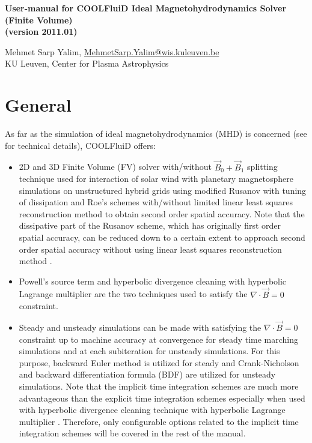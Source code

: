 \documentclass[11pt]{article}
\begin{document}
\pagestyle{empty}

\begin{center}
  {\fontsize{14}{20}\bf 
    User-manual for COOLFluiD Ideal Magnetohydrodynamics Solver (Finite Volume) \\
    (version 2011.01) \\[10pt]}
\end{center}

\begin{center}
  {Mehmet Sarp Yalim, \underline{MehmetSarp.Yalim@wis.kuleuven.be} \\
    KU Leuven, Center for Plasma Astrophysics}
\end{center}

\section{General}

As far as the simulation of ideal magnetohydrodynamics (MHD) is concerned (see \cite{yalim08, phd:yalim, yalim11jcp, yalim11jgr} for technical details), COOLFluiD \cite{lani05, lani06, phd:lani, phd:quintino, phd:wuilbaut} offers: 
\begin{itemize}
\item 
  2D and 3D Finite Volume (FV) solver with/without $\vec{B}_{0}+\vec{B}_{1}$ splitting technique \cite{tanaka94} used for interaction of solar wind with planetary magnetosphere simulations \cite{phd:yalim, yalim11jgr} on unstructured hybrid grids using modified Rusanov with tuning of dissipation and Roe's schemes with/without limited linear least squares reconstruction method to obtain second order spatial accuracy. Note that the dissipative part of the Rusanov scheme, which has originally first order spatial accuracy, can be reduced down to a certain extent to approach second order spatial accuracy without using linear least squares reconstruction method \cite{yalim11jcp}. 
\item 
  Powell's source term \cite{powell95} and hyperbolic divergence cleaning with hyperbolic Lagrange multiplier \cite{dedner02} are the two techniques used to satisfy the $\nabla\cdot\vec{B}=0$ constraint.
\item
  Steady and unsteady simulations can be made with satisfying the $\nabla\cdot\vec{B}=0$ constraint up to machine accuracy at convergence for steady time marching simulations and at each subiteration for unsteady simulations. For this purpose, backward Euler method is utilized for steady and Crank-Nicholson and backward differentiation formula (BDF) are utilized for unsteady simulations. Note that the implicit time integration schemes are much more advantageous than the explicit time integration schemes especially when used with hyperbolic divergence cleaning technique with hyperbolic Lagrange multiplier \cite{yalim11jcp}. Therefore, only configurable options related to the implicit time integration schemes will be covered in the rest of the manual.
\end{itemize}
\end{document}
